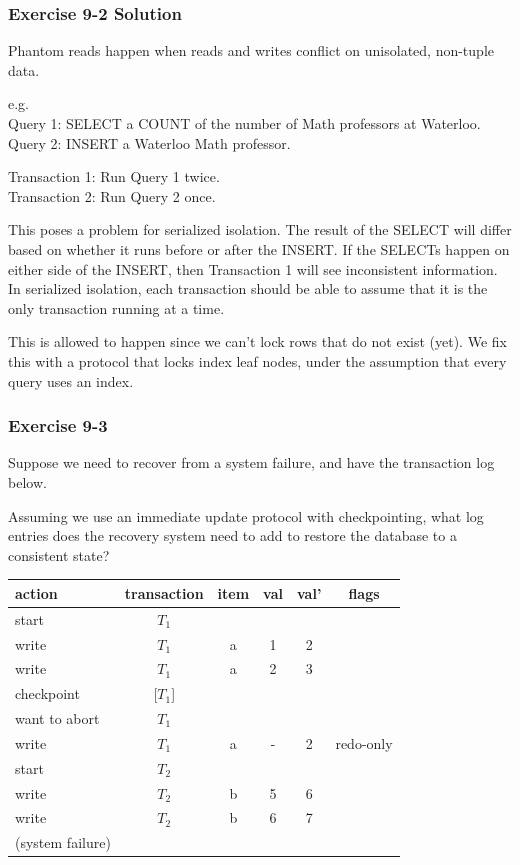\begin{frame}
\frametitle{Exercise 9-2 Solution}

Phantom reads happen when reads and writes conflict on unisolated, non-tuple data.

e.g. \\
Query 1: SELECT a COUNT of the number of Math professors at Waterloo. \\
Query 2: INSERT a Waterloo Math professor.

Transaction 1: Run Query 1 twice. \\
Transaction 2: Run Query 2 once.

This poses a problem for serialized isolation. The result of the SELECT will differ based on whether it runs before or after the INSERT. If the SELECTs happen on either side of the INSERT, then Transaction 1 will see inconsistent information. In serialized isolation, each transaction should be able to assume that it is the only transaction running at a time.

This is allowed to happen since we can't lock rows that do not exist (yet). We fix this with a protocol that locks index leaf nodes, under the assumption that every query uses an index.

\end{frame}


\begin{frame}
\frametitle{Exercise 9-3}

Suppose we need to recover from a system failure, and have the transaction log below.

Assuming we use an immediate update protocol with checkpointing, what log entries does the recovery system need to add to restore the database to a consistent state?

\begin{center}
\begin{tabular}{ | l | c c c c | c | }
  \hline
  action & transaction & item & val & val' & flags \\
  \hline
  start & $T_1$ &   &   &   &           \\
  write & $T_1$ & a & 1 & 2 &           \\
  write & $T_1$ & a & 2 & 3 &           \\
  checkpoint & [$T_1$] &   &   &   &           \\
  want to abort & $T_1$ &   &   &   &           \\
  write & $T_1$ & a & - & 2 & redo-only \\
  start & $T_2$ &   &   &   &           \\
  write & $T_2$ & b & 5 & 6 &           \\
  write & $T_2$ & b & 6 & 7 &           \\
  (system failure) &       &   &   &   &           \\
  \hline
\end{tabular}
\end{center}

\end{frame}


